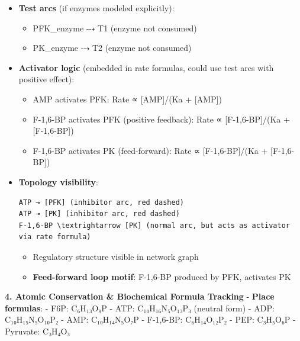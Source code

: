 \begin{itemize}
\item
  \textbf{Test arcs} (if enzymes modeled explicitly):

  \begin{itemize}
  \tightlist
  \item
    PFK\_enzyme ⤏ T1 (enzyme not consumed)
  \item
    PK\_enzyme ⤏ T2 (enzyme not consumed)
  \end{itemize}
\item
  \textbf{Activator logic} (embedded in rate formulas, could use test
  arcs with positive effect):

  \begin{itemize}
  \tightlist
  \item
    AMP activates PFK: Rate ∝ {[}AMP{]}/(Ka + {[}AMP{]})
  \item
    F-1,6-BP activates PFK (positive feedback): Rate ∝
    {[}F-1,6-BP{]}/(Ka + {[}F-1,6-BP{]})
  \item
    F-1,6-BP activates PK (feed-forward): Rate ∝ {[}F-1,6-BP{]}/(Ka +
    {[}F-1,6-BP{]})
  \end{itemize}
\item
  \textbf{Topology visibility}:

\begin{lstlisting}
ATP ⊸ [PFK] (inhibitor arc, red dashed)
ATP ⊸ [PK] (inhibitor arc, red dashed)
F-1,6-BP \textrightarrow [PK] (normal arc, but acts as activator via rate formula)
\end{lstlisting}

  \begin{itemize}
  \tightlist
  \item
    Regulatory structure visible in network graph
  \item
    \textbf{Feed-forward loop motif}: F-1,6-BP produced by PFK,
    activates PK
  \end{itemize}
\end{itemize}

\textbf{4. Atomic Conservation \& Biochemical Formula Tracking} \checkmark -
\textbf{Place formulas}: - F6P: C₆H₁₃O₉P - ATP: C₁₀H₁₆N₅O₁₃P₃ (neutral
form) - ADP: C₁₀H₁₅N₅O₁₀P₂ - AMP: C₁₀H₁₄N₅O₇P - F-1,6-BP: C₆H₁₄O₁₂P₂ -
PEP: C₃H₅O₆P - Pyruvate: C₃H₄O₃

